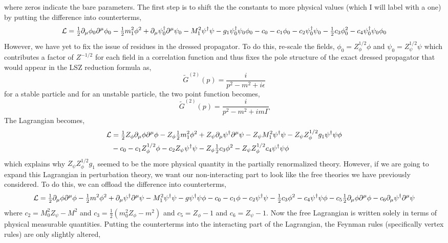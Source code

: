 \documentclass{article}
\begin{document}
where zeros indicate the bare parameters. The first step is to shift the the constants to more physical values (which I will label with a one) by putting the difference into counterterms,
\[ \mathcal{L} = \tfrac{1}{2} \partial_\mu \phi_0 \partial^\mu \phi_0 - \tfrac{1}{2} m_1^2 \phi^2 + \partial_\mu \psi^\dagger_0 \partial^\mu \psi_0 - M_1^2 \psi^\dagger \psi - g_1 \psi^\dagger_0 \psi_0 \phi_0 - c_0 - c_1 \phi_0 - c_2 \psi^\dagger_0 \psi_0 -\tfrac{1}{2} c_3 \phi_0^2 - c_4 \psi^\dagger_0 \psi_0 \phi_0 \]  
However, we have yet to fix the issue of residues in the dressed propagator. To do this, re-scale the fields, $\phi_0 = Z^{1/2}_\phi \phi$ and $\psi_0= Z^{1/2}_\psi \psi$ which contributes a factor of $Z^{-1/2}$ for each field in a correlation function and thus fixes the pole structure of the exact dressed propagator that would appear in the LSZ reduction formula as,
\[ \tilde{G}^{(2)}(p) = \frac{i}{p^2 - m^2 + i \epsilon} \] 
for a stable particle and for an unstable particle, the two point function becomes,
\[ \tilde{G}^{(2)}(p) = \frac{i}{p^2 - m^2 + i m \Gamma} \] 
The Lagrangian becomes,
\begin{align*}
\mathcal{L} & = \tfrac{1}{2} Z_\phi \partial_\mu \phi \partial^\mu \phi - Z_\phi \tfrac{1}{2} m_1^2 \phi^2 + Z_\psi \partial_\mu \psi^\dagger \partial^\mu \psi - Z_\psi M_1^2 \psi^\dagger \psi - Z_\psi Z_\phi^{1/2} g_1 \psi^\dagger \psi \phi 
\\
& - c_0 - c_1 Z_\phi^{1/2} \phi - c_2 Z_\psi \psi^\dagger \psi - Z_\phi \tfrac{1}{2} c_3 \phi^2 - Z_\psi Z_\phi^{1/2} c_4 \psi^\dagger \psi \phi
\end{align*} 
which explains why $Z_\psi Z_\phi^{1/2} g_1$ seemed to be the more physical quantity in the partially renormalized theory. However, if we are going to expand this Lagrangian in perturbation theory, we want our non-interacting part to look like the free theories we have previously considered. To do this, we can offload the difference into counterterms, 
\[ \mathcal{L} = \tfrac{1}{2} \partial_\mu \phi \partial^\mu \phi -  \tfrac{1}{2} m^2 \phi^2 + \partial_\mu \psi^\dagger \partial^\mu \psi - M_1^2 \psi^\dagger \psi - g \psi^\dagger \psi \phi - c_0 - c_1 \phi - c_2 \psi^\dagger \psi - \tfrac{1}{2} c_3 \phi^2 - c_4 \psi^\dagger \psi \phi - c_5 \tfrac{1}{2} \partial_\mu \phi \partial^\mu \phi - c_6 \partial_\mu \psi^\dagger \partial^\mu \psi \] 
where $c_2 = M_0^2 Z_\psi - M^2$ and $c_3 = \tfrac{1}{2} (m_0^2 Z_\phi - m^2)$ and $c_5 = Z_\phi - 1$ and $c_6 = Z_\psi - 1$. 
Now the free Lagrangian is written solely in terms of physical measurable quantities. 
Putting the counterterms into the interacting part of the Lagrangian, the Feynman rules (specifically vertex rules) are only slightly altered, 
\end{document}
